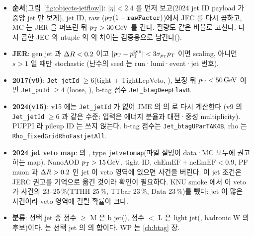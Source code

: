 \begin{itemize}
\item \textbf{순서}(그림~\ref{fig:objects-jetflow}): $|\eta|<2.4$ 를 먼저 보고(2024 jet ID payload 가 중앙 jet 만 보게), jet ID, raw \pt{}
  ($p_{\mathrm{T}}(1-\texttt{rawFactor})$)에서 JEC 를 다시 곱하고, MC 는 JER 을 퍼뜨린 뒤 $p_{\mathrm{T}}>30\,\mathrm{GeV}$ 를 건다. 질량도 같은 비율로 고친다. 다시 곱한
  JEC 와 ntuple 의 \pt{} 의 차이는 검증용으로 남긴다()\tagimpl.
\item \textbf{JER}: gen jet 과 $\Delta R<0.2$ 이고 $|p_{\mathrm{T}}-p_\text{T}^\text{gen}|<3\sigma_{p_{\mathrm{T}}}p_{\mathrm{T}}$ 이면 scaling, 아니면 $s>1$ 일 때만 stochastic
  (난수의 seed 는 run·lumi·event·jet 번호)\tagimpl.
\item \textbf{2017(v9)}: \texttt{Jet\_jetId} $\geq 6$(tight + TightLepVeto, ), 보정 뒤 $p_{\mathrm{T}}<50\,\mathrm{GeV}$ 이면 \texttt{Jet\_puId} $\geq 4$
  (loose, ), b-tag 점수 \texttt{Jet\_btagDeepFlavB}\tagimpl.
\item \textbf{2024(v15)}: v15 에는 \texttt{Jet\_jetId} 가 없어 JME 의  의  로 다시 계산한다
  (v9 의 \texttt{Jet\_jetId} $\geq 6$ 과 같은 수준; 입력은 에너지 분율과 대전·중성 multiplicity). PUPPI 라 pileup ID 는 쓰지 않는다. b-tag 점수는
  \texttt{Jet\_btagUParTAK4B}, rho 는 \texttt{Rho\_fixedGridRhoFastjetAll}\tagimpl\tagrunthree.
\item \textbf{2024 jet veto map}:  의 , type \texttt{jetvetomap}(파일 설명이
  data·MC 모두에 권고하는 map). NanoAOD $p_{\mathrm{T}}>15\,\mathrm{GeV}$, tight ID, $\text{chEmEF}+\text{neEmEF}<0.9$, PF muon 과 $\Delta R>0.2$ 인 jet 이 veto 영역에
  있으면 사건을 버린다. 이 jet 조건은 JERC 권고를 기억으로 옮긴 것이라 확인이 필요하다.
  KNU smoke 에서 이 veto 가 사건의 23–25\,\%(TTHH 25\,\%, TTbar 23\,\%, Data 23\,\%)를 뺐다: jet 이 많은 사건이라 veto 영역에 걸릴 확률이
  크다\tagimpl\tagrunthree.
\item \textbf{분류}: 선택 jet 중 점수 $\geq$ M 은 b jet(), 점수 $<$ L 은 light jet(, hadronic W 의
  후보)이다. \HT{} 는 선택 jet 의 \pt{} 의 합이다.
  WP 는 \ref{ch:btag} 장.
\end{itemize}

